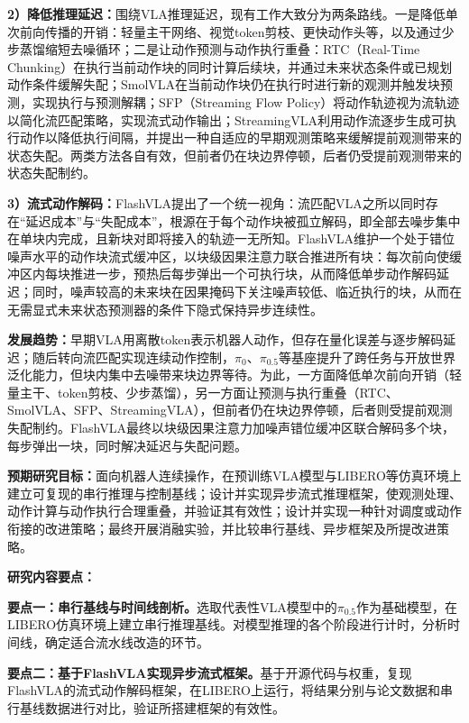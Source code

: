\textbf{2）降低推理延迟：}围绕VLA推理延迟，现有工作大致分为两条路线。一是降低单次前向传播的开销：轻量主干网络、视觉token剪枝、更快动作头等，以及通过少步蒸馏缩短去噪循环；二是让动作预测与动作执行重叠：RTC（Real-Time Chunking）在执行当前动作块的同时计算后续块，并通过未来状态条件或已规划动作条件缓解失配；SmolVLA在当前动作块仍在执行时进行新的观测并触发块预测，实现执行与预测解耦；SFP（Streaming Flow Policy）将动作轨迹视为流轨迹以简化流匹配策略，实现流式动作输出；StreamingVLA利用动作流逐步生成可执行动作以降低执行间隔，并提出一种自适应的早期观测策略来缓解提前观测带来的状态失配。两类方法各自有效，但前者仍在块边界停顿，后者仍受提前观测带来的状态失配制约。

\textbf{3）流式动作解码：}FlashVLA提出了一个统一视角：流匹配VLA之所以同时存在“延迟成本”与“失配成本”，根源在于每个动作块被孤立解码，即全部去噪步集中在单块内完成，且新块对即将接入的轨迹一无所知。FlashVLA维护一个处于错位噪声水平的动作块流式缓冲区，以块级因果注意力联合推进所有块：每次前向使缓冲区内每块推进一步，预热后每步弹出一个可执行块，从而降低单步动作解码延迟；同时，噪声较高的未来块在因果掩码下关注噪声较低、临近执行的块，从而在无需显式未来状态预测器的条件下隐式保持异步连续性。

\textbf{发展趋势：}早期VLA用离散token表示机器人动作，但存在量化误差与逐步解码延迟；随后转向流匹配实现连续动作控制，\(\pi_0\)、\(\pi_{0.5}\)等基座提升了跨任务与开放世界泛化能力，但块内集中去噪带来块边界等待。为此，一方面降低单次前向开销（轻量主干、token剪枝、少步蒸馏），另一方面让预测与执行重叠（RTC、SmolVLA、SFP、StreamingVLA），但前者仍在块边界停顿，后者则受提前观测失配制约。FlashVLA最终以块级因果注意力加噪声错位缓冲区联合解码多个块，每步弹出一块，同时解决延迟与失配问题。



\textbf{预期研究目标：}面向机器人连续操作，在预训练VLA模型与LIBERO等仿真环境上建立可复现的串行推理与控制基线；设计并实现异步流式推理框架，使观测处理、动作计算与动作执行合理重叠，并验证其有效性；设计并实现一种针对调度或动作衔接的改进策略；最终开展消融实验，并比较串行基线、异步框架及所提改进策略。

\textbf{研究内容要点：}

\textbf{要点一：串行基线与时间线剖析。}选取代表性VLA模型中的\(\pi_{0.5}\)作为基础模型，在LIBERO仿真环境上建立串行推理基线。对模型推理的各个阶段进行计时，分析时间线，确定适合流水线改造的环节。

\textbf{要点二：基于FlashVLA实现异步流式框架。}基于开源代码与权重，复现FlashVLA的流式动作解码框架，在LIBERO上运行，将结果分别与论文数据和串行基线数据进行对比，验证所搭建框架的有效性。

